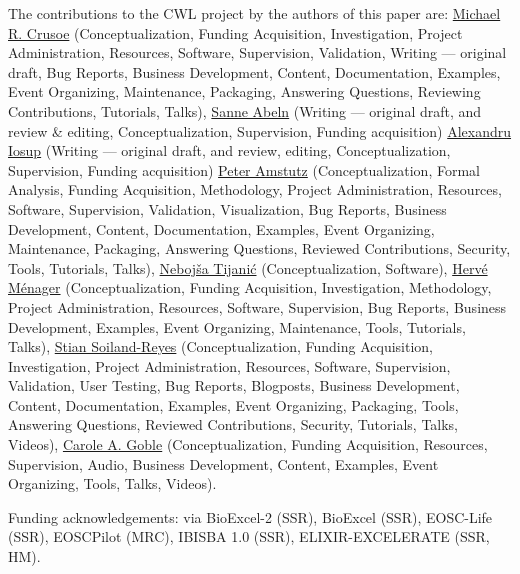 \documentclass[sigconf,authordraft]{acmart}
\begin{document}
\begin{acks}
The contributions to the CWL project by the authors of this paper are:
\href{https://orcid.org/0000-0002-2961-9670}{Michael R. Crusoe} (Conceptualization, Funding Acquisition, Investigation, Project Administration, Resources, Software, Supervision, Validation, Writing --- original draft, Bug Reports, Business Development, Content, Documentation, Examples, Event Organizing, Maintenance, Packaging, Answering Questions, Reviewing Contributions, Tutorials, Talks),
\href{https://orcid.org/0000-0002-2779-7174}{Sanne Abeln} (Writing --- original draft, and review \& editing, Conceptualization, Supervision, Funding acquisition)
\href{https://orcid.org/0000-0001-8030-9398}{Alexandru Iosup} (Writing --- original draft, and review, editing, Conceptualization, Supervision, Funding acquisition)
\href{https://orcid.org/0000-0003-3566-7705}{Peter Amstutz} (Conceptualization, Formal Analysis, Funding Acquisition, Methodology, Project Administration, Resources, Software, Supervision, Validation, Visualization, Bug Reports, Business Development, Content, Documentation, Examples, Event Organizing, Maintenance, Packaging, Answering Questions, Reviewed Contributions, Security, Tools, Tutorials, Talks),
\href{https://orcid.org/0000-0001-8316-4067}{Nebojša Tijanić} (Conceptualization, Software),
\href{https://orcid.org/0000-0002-7552-1009}{Hervé Ménager} (Conceptualization, Funding Acquisition, Investigation, Methodology, Project Administration, Resources, Software, Supervision, Bug Reports, Business Development, Examples, Event Organizing, Maintenance, Tools, Tutorials, Talks),
\href{https://orcid.org/0000-0001-9842-9718}{Stian Soiland-Reyes} (Conceptualization, Funding Acquisition, Investigation, Project Administration, Resources, Software, Supervision, Validation, User Testing, Bug Reports, Blogposts, Business Development, Content, Documentation, Examples, Event Organizing, Packaging, Tools, Answering Questions, Reviewed Contributions, Security, Tutorials, Talks, Videos),
\href{https://orcid.org/0000-0003-1219-2137}{Carole A. Goble} (Conceptualization, Funding Acquisition, Resources, Supervision, Audio, Business Development, Content, Examples, Event Organizing, Tools, Talks, Videos).

Funding acknowledgements:  via   BioExcel-2 (SSR),  BioExcel (SSR),  EOSC-Life (SSR),  EOSCPilot (MRC),  IBISBA 1.0 (SSR),  ELIXIR-EXCELERATE (SSR, HM).

\end{acks}




\end{document}
